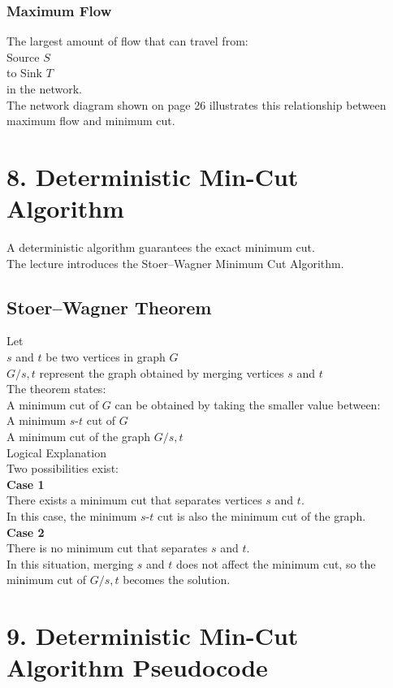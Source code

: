 \documentclass{article}
\begin{document}
\subsubsection{Maximum Flow}
The largest amount of flow that can travel from: \\
Source $S$ \\
to Sink $T$ \\
in the network. \\
The network diagram shown on page 26 illustrates this relationship between maximum flow and minimum cut.

\section{8. Deterministic Min-Cut Algorithm}
A deterministic algorithm guarantees the exact minimum cut. \\
The lecture introduces the Stoer–Wagner Minimum Cut Algorithm.

\subsection{Stoer–Wagner Theorem}
Let \\
$s$ and $t$ be two vertices in graph $G$ \\
$G/{s,t}$ represent the graph obtained by merging vertices $s$ and $t$ \\
The theorem states: \\
A minimum cut of $G$ can be obtained by taking the smaller value between: \\
A minimum $s$-$t$ cut of $G$ \\
A minimum cut of the graph $G/{s,t}$ \\
Logical Explanation \\
Two possibilities exist: \\
\textbf{Case 1} \\
There exists a minimum cut that separates vertices $s$ and $t$. \\
In this case, the minimum $s$-$t$ cut is also the minimum cut of the graph. \\
\textbf{Case 2} \\
There is no minimum cut that separates $s$ and $t$. \\
In this situation, merging $s$ and $t$ does not affect the minimum cut, so the minimum cut of $G/{s,t}$ becomes the solution.

\section{9. Deterministic Min-Cut Algorithm Pseudocode}
\end{document}
